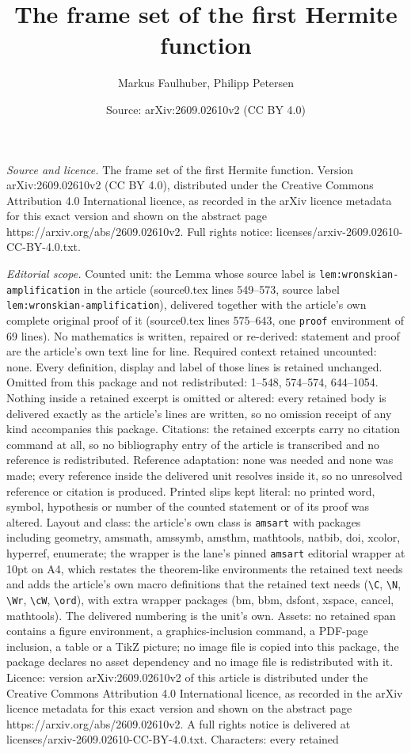 \documentclass[10pt,a4paper]{amsart}
\title[The frame set of the first Hermite function]{The frame set of the first Hermite function}
\author{Markus Faulhuber, Philipp Petersen}
\date{Source: arXiv:2609.02610v2 (CC BY 4.0)}
\begin{document}
\maketitle

\noindent\emph{Source and licence.} The frame set of the first Hermite function. Version arXiv:2609.02610v2 (CC BY 4.0), distributed under the Creative Commons Attribution 4.0 International licence, as recorded in the arXiv licence metadata for this exact version and shown on the abstract page https://arxiv.org/abs/2609.02610v2. Full rights notice: licenses/arxiv-2609.02610-CC-BY-4.0.txt.\par\smallskip

\noindent\textit{Editorial scope.} Counted unit: the Lemma whose source label is \texttt{lem:wronskian-amplification} in the article (source0.tex lines 549--573, source label \texttt{lem:wronskian-amplification}), delivered together with the article's own complete original proof of it (source0.tex lines 575--643, one \texttt{proof} environment of 69 lines). No mathematics is written, repaired or re-derived: statement and proof are the article's own text line for line. Required context retained uncounted: none. Every definition, display and label of those lines is retained unchanged. Omitted from this package and not redistributed: 1--548, 574--574, 644--1054. Nothing inside a retained excerpt is omitted or altered: every retained body is delivered exactly as the article's lines are written, so no omission receipt of any kind accompanies this package. Citations: the retained excerpts carry no citation command at all, so no bibliography entry of the article is transcribed and no reference is redistributed. Reference adaptation: none was needed and none was made; every reference inside the delivered unit resolves inside it, so no unresolved reference or citation is produced. Printed slips kept literal: no printed word, symbol, hypothesis or number of the counted statement or of its proof was altered. Layout and class: the article's own class is \texttt{amsart} with packages including geometry, amsmath, amssymb, amsthm, mathtools, natbib, doi, xcolor, hyperref, enumerate; the wrapper is the lane's pinned \texttt{amsart} editorial wrapper at 10pt on A4, which restates the theorem-like environments the retained text needs and adds the article's own macro definitions that the retained text needs (\texttt{\textbackslash C}, \texttt{\textbackslash N}, \texttt{\textbackslash Wr}, \texttt{\textbackslash cW}, \texttt{\textbackslash ord}), with extra wrapper packages (bm, bbm, dsfont, xspace, cancel, mathtools). The delivered numbering is the unit's own. Assets: no retained span contains a figure environment, a graphics-inclusion command, a PDF-page inclusion, a table or a TikZ picture; no image file is copied into this package, the package declares no asset dependency and no image file is redistributed with it. Licence: version arXiv:2609.02610v2 of this article is distributed under the Creative Commons Attribution 4.0 International licence, as recorded in the arXiv licence metadata for this exact version and shown on the abstract page https://arxiv.org/abs/2609.02610v2. A full rights notice is delivered at licenses/arxiv-2609.02610-CC-BY-4.0.txt. Characters: every retained 
\end{document}
